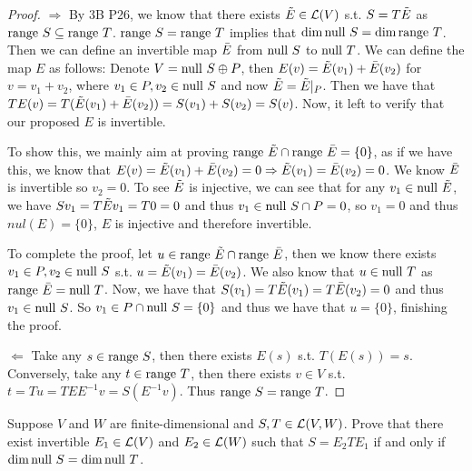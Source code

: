 \documentclass{extarticle}
\begin{document}
\begin{proof}
\(\Rightarrow\) By 3B P26, we know that there exists \(\Tilde{E} \in \mathcal{L}(V)\) s.t. \(S = T \Tilde{E}\) as 
\(\text{range } S \subseteq \text{range } T\). \(\text{range } S = \text{range } T\) implies that \(\dim \text{null } S = \dim \text{range } T\). 
Then we can define an invertible map \(\bar{E}\) from \(\text{null } S\) to \(\text{null } T\). We can define the map \(E\) as follows:
Denote \(V = \text{null } S \oplus P\), then \(E(v) = \Tilde{E}(v_1) + \bar{E}(v_2)\) for \(v = v_1 + v_2\), where 
\(v_1 \in P, v_2 \in \text{null } S\) and now \(\Tilde{E} = \Tilde{E} |_P\). Then we have that \(TE(v) = T(\Tilde{E}(v_1) + \bar{E}(v_2)) = S(v_1)
+ S(v_2) = S(v)\). Now, it left to verify that our proposed \(E\) is invertible. 

To show this, we mainly aim at proving \(\text{range } \tilde{E} \cap \text{range } \bar{E} = \{0\}\), as if we have this, we 
know that \(E(v) = \Tilde{E}(v_1) + \bar{E}(v_2) = 0 \Rightarrow \Tilde{E}(v_1) = \bar{E}(v_2) = 0\). We know \(\bar{E}\) is 
invertible so \(v_2 = 0\). To see \(\Tilde{E}\) is injective, we can see that for any \(v_1 \in \text{null } \Tilde{E}\), we 
have \(S v_1 = T \Tilde{E} v_1 = T 0 = 0\) and thus \(v_1 \in \text{null } S \cap P = 0\), so \(v_1 = 0\) and thus 
\(nul (E) = \{0\}\), \(E\) is injective and therefore invertible. 

To complete the proof, let \(u \in \text{range } \Tilde{E} \cap \text{range } \bar{E}\), then we know there exists 
\(v_1 \in P, v_2 \in \text{null } S\) s.t. \(u = \Tilde{E}(v_1) = \bar{E}(v_2)\). We also know that \(u \in \text{null } T\)
as \(\text{range } \bar{E} = \text{null } T\). Now, we have that \(S (v_1) = T \Tilde{E}(v_1) = T \bar{E}(v_2) = 0\) and thus 
\(v_1 \in \text{null } S\). So \(v_1 \in  P \cap \text{null } S = \{0\}\) and thus we have that \(u = \{0\}\), finishing 
the proof.



\(\Leftarrow\) Take any \(s \in \text{range } S\), then there exists \(E(s)\) s.t. \(T(E(s)) = s\). Conversely, 
take any \(t \in \text{range } T\), then there exists \(v \in V\) s.t. \(t = Tu = TE E^{-1}v = S (E^{-1}v)\). 
Thus \(\text{range } S = \text{range } T\). 
\end{proof}

\begin{problem}{8}
    Suppose \(V\) and \(W\) are finite-dimensional and \(S, T \in \mathcal{L}(V, W)\). Prove that 
    there exist invertible \(E_1 \in \mathcal{L}(V)\) and \(E_2 \in \mathcal{L}(W)\) such that 
    \(S = E_2 T E_1\) if and only if \(\dim \text{null } S = \dim \text{null } T\). 
\end{problem}
\end{document}
